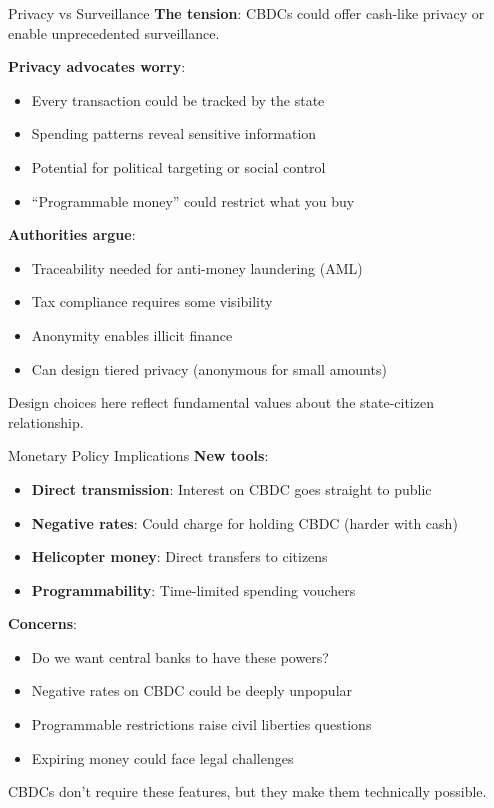 \documentclass[10pt]{beamer}
\begin{document}
\begin{frame}{Privacy vs Surveillance}
  \textbf{The tension}: CBDCs could offer cash-like privacy or enable unprecedented surveillance.
  
  \vspace{1em}
  \textbf{Privacy advocates worry}:
  \begin{itemize}
    \item Every transaction could be tracked by the state
    \item Spending patterns reveal sensitive information
    \item Potential for political targeting or social control
    \item ``Programmable money'' could restrict what you buy
  \end{itemize}
  
  \vspace{1em}
  \textbf{Authorities argue}:
  \begin{itemize}
    \item Traceability needed for anti-money laundering (AML)
    \item Tax compliance requires some visibility
    \item Anonymity enables illicit finance
    \item Can design tiered privacy (anonymous for small amounts)
  \end{itemize}
  
  \vspace{0.5em}
  Design choices here reflect fundamental values about the state-citizen relationship.
\end{frame}

\begin{frame}{Monetary Policy Implications}
  \textbf{New tools}:
  \begin{itemize}
    \item \textbf{Direct transmission}: Interest on CBDC goes straight to public
    \item \textbf{Negative rates}: Could charge for holding CBDC (harder with cash)
    \item \textbf{Helicopter money}: Direct transfers to citizens
    \item \textbf{Programmability}: Time-limited spending vouchers
  \end{itemize}
  
  \vspace{1em}
  \textbf{Concerns}:
  \begin{itemize}
    \item Do we want central banks to have these powers?
    \item Negative rates on CBDC could be deeply unpopular
    \item Programmable restrictions raise civil liberties questions
    \item Expiring money could face legal challenges
  \end{itemize}
  
  \vspace{1em}
  CBDCs don't require these features, but they make them technically possible.
\end{frame}
\end{document}
